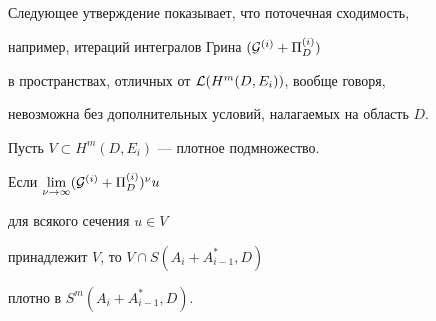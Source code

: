 Следующее утверждение показывает, что поточечная сходимость,


например, итераций интегралов Грина $({\cal G}^{(i)}+\Pi^{(i)}_D)$


в пространствах, отличных от ${\cal L}(H^m (D,E_i))$, вообще говоря, 


невозможна без дополнительных условий, налагаемых на область $D$.








\begin{propnonum} \label{p.iter.not} 


Пусть $V \subset H^m (D, E_i)$ --- плотное подмножество.


Если $\lim\limits_{\nu\to\infty}({\cal G}^{(i)}+\Pi^{(i)}_D)^\nu u $


для всякого сечения $u \in V$


принадлежит $V$, то $V \cap S (A_i+ A^*_{i-1},D)$


плотно в $S^m (A_i+A^*_{i-1}, D)$.


\end{propnonum}








